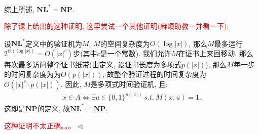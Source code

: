 \documentclass[11pt]{article}
\newcommand{\NP}{\mathbf{NP}}
\newcommand{\NL}{ \mathbf{NL}}
\newcommand{\1}{\mathbf{1}}
\newenvironment{answer}[1][Answer]{\begin{trivlist}
\item[\hskip \labelsep{\bfseries\itshape#1.}\hskip \labelsep]}{\hfill$\lhd$\end{trivlist}}
\begin{document}
\begin{answer}
    综上所述, $\NL^* = \NP$.

    \textcolor{red}{除了课上给出的这种证明, 这里尝试一个其他证明(麻烦助教一并看一下):}

    设$\NL^*$定义中的验证机为$M$, $M$的空间复杂度为$O(\log |x|)$, 那么$M$最多运行$2^{O(\log |x|)} = O(|x|^c)$步(其中$c$是一个常数). 我们允许$M$在证书上来回移动, 那么每次最多访问整个证书纸带(由定义, 设证书长度为多项式$p(|x|)$), 那么$M$每一步的时间复杂度为为$O(p(|x|))$, 故整个验证过程的时间复杂度为$O(|x|^c \cdot p(|x|))$.  因此, $M$是多项式时间验证机, 且:
    \begin{align*}
        x \in A \iff \exists u \in \{0, 1\}^{p(|x|)} ~s.t.~ M(x, u) = 1.
    \end{align*}
    这即是$\NP$的定义, 故$\NL^* = \NP$.

    \textcolor{red}{这种证明不太正确。。。}
\end{answer}
\end{document}
